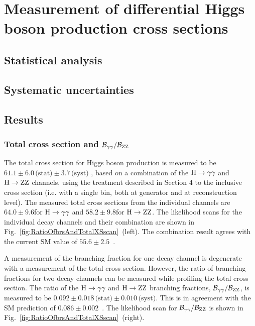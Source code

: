 \section{Measurement of differential Higgs boson production cross sections}



\subsection{Statistical analysis}



\subsection{Systematic uncertainties}



\subsection{Results}


\subsubsection{Total cross section and \texorpdfstring{$\mathcal{B}_{\mathrm{\gamma}\mathrm{\gamma}}/\mathcal{B}_{\mathrm{Z}\mathrm{Z}}$}{BRgg/BRZZ}}


The total cross section for Higgs boson production is measured to be
$61.1   \pm 6.0 \,\text{(stat)}   \pm 3.7 \,\text{(syst)}  $\pb
, based on a combination of the $\mathrm{H}\to\mathrm{\gamma}\mathrm{\gamma}$ and $\mathrm{H}\to\mathrm{Z}\mathrm{Z}$ channels, using the treatment described in Section 4 to the inclusive cross section (i.e. with a single bin, both at generator and at reconstruction level).
% 
The measured total cross sections from the individual channels are $64.0\pm9.6$\pb for $\mathrm{H}\to\mathrm{\gamma}\mathrm{\gamma}$ and $58.2\pm9.8$\pb for $\mathrm{H}\to\mathrm{Z}\mathrm{Z}$.
% 
The likelihood scans for the individual decay channels and their combination are shown in Fig.~\ref{fig:RatioOfbrsAndTotalXSscan}~(left).
% 
The combination result agrees with the current SM value of $55.6\pm2.5$\pb~\cite{deFlorian:2016spz}.


A measurement of the branching fraction for one decay channel is degenerate with a measurement of the total cross section.
% 
However, the ratio of branching fractions for two decay channels can be measured while profiling the total cross section.
% 
The ratio of the $\mathrm{H}\to\mathrm{\gamma}\mathrm{\gamma}$ and $\mathrm{H}\to\mathrm{Z}\mathrm{Z}$ branching fractions, $\mathcal{B}_{\mathrm{\gamma}\mathrm{\gamma}}/\mathcal{B}_{\mathrm{Z}\mathrm{Z}}$, is measured to be
$0.092   \pm 0.018 \,\text{(stat)}   \pm 0.010 \,\text{(syst)}  $.
% 
This is in agreement with the SM prediction of $0.086 \pm 0.002$~\cite{deFlorian:2016spz}.
% 
The likelihood scan for $\mathcal{B}_{\mathrm{\gamma}\mathrm{\gamma}}/\mathcal{B}_{\mathrm{Z}\mathrm{Z}}$ is shown in Fig.~\ref{fig:RatioOfbrsAndTotalXSscan}~(right).



